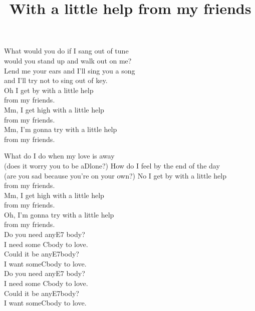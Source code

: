 \title{With a little help from my friends} 

\begin{enumerate}
\verse {} What would you  do if I  sang out of tune \\ 
would you stand up and  walk out on  me? \\ 
Lend me your  ears and I’ll  sing you a song \\ 
and I’ll try not to  sing out of  key. \\ 
Oh I get  by with a little  help \\ 
from my  friends. \\ 
Mm, I get  high with a little  help \\ 
from my  friends. \\ 
Mm, I’m gonna  try with a little help \\ 
from my  friends.

\verse {} What do I  do when my  love is away \\ 
(does it worry you to  be aDlone?)
How do I  feel by the  end of the day \\ 
(are you sad because you’re  on your  own?)
No I get  by with a little  help \\ 
from my  friends. \\ 
Mm, I get  high with a little  help \\ 
from my  friends. \\ 
Oh, I’m gonna  try with a little help \\ 
from my  friends. \\ 
Do you  need anyE7 body? \\ 
I  need some Cbody to  love. \\ 
Could it  be anyE7body? \\ 
I  want someCbody to  love. \\ 
Do you  need anyE7 body? \\ 
I  need some Cbody to  love. \\ 
Could it  be anyE7body? \\ 
I  want someCbody to  love.


\end{enumerate}
